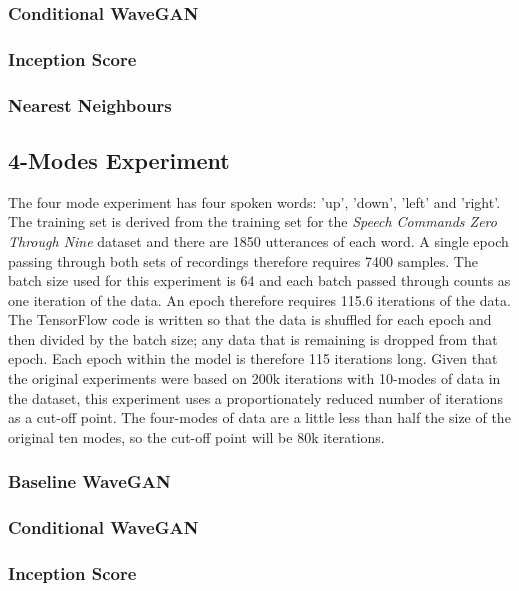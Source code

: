 \documentclass[a4paper, titlepage]{article}
\begin{document}
\subsubsection{Conditional WaveGAN}

\subsubsection{Inception Score}

\subsubsection{Nearest Neighbours}

\subsection{4-Modes Experiment}

The four mode experiment has four spoken words: 'up', 'down', 'left' and 'right'.
The training set is derived from the training set for the \textit{Speech Commands Zero Through Nine} dataset and there are 1850 utterances of each word.
A single epoch passing through both sets of recordings therefore requires 7400 samples. 
\newpage
\newpage
The batch size used for this experiment is 64 and each batch passed through counts as one iteration of the data.
An epoch therefore requires 115.6 iterations of the data.
The TensorFlow code is written so that the data is shuffled for each epoch and then divided by the batch size; any data that is remaining is dropped from that epoch.
Each epoch within the model is therefore 115 iterations long.
\newpage
\newpage
Given that the original experiments were based on 200k iterations with 10-modes of data in the dataset, this experiment uses a proportionately reduced number of iterations as a cut-off point.
The four-modes of data are a little less than half the size of the original ten modes, so the cut-off point will be 80k iterations.

\subsubsection{Baseline WaveGAN}

\subsubsection{Conditional WaveGAN}

\subsubsection{Inception Score}
\end{document}
